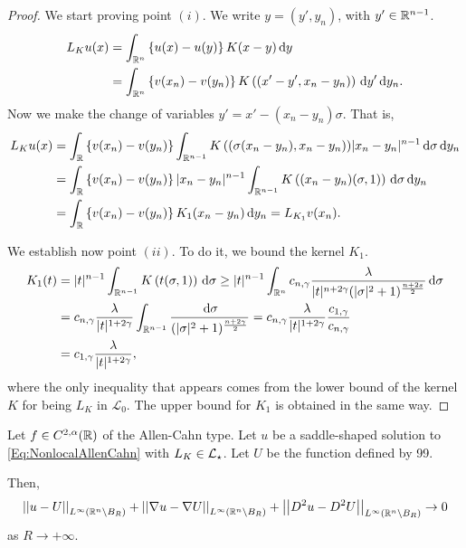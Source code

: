 \begin{proof}
	We start proving point $(i)$. We write $y=(y',y_n)$, with $y'\in \mathbb{R}^{n-1}$.
	\begin{align*}
	L_K u(x) &= \int_{\mathbb{R}^n} \left\{ u(x)-u(y) \right\} K(x-y) \,\mathrm{d} y \\
	&=\int_{\mathbb{R}^n} \left\{ v(x_n)-v(y_n) \right\} K\left((x'-y',x_n-y_n)\right) \,\mathrm{d} y' \,\mathrm{d} y_n.
	\end{align*}
	Now we make the change of variables $y' = x'-(x_n-y_n)\sigma$. That is,
	\begin{align*}
	L_K u(x) &= \int_{\mathbb{R}} \left\{ v(x_n)-v(y_n) \right\} \int_{\mathbb{R}^{n-1}} K\left((\sigma(x_n-y_n),x_n-y_n\right)) |x_n-y_n|^{n-1} \,\mathrm{d} \sigma \,\mathrm{d} y_n \\
	&= \int_{\mathbb{R}} \left\{ v(x_n)-v(y_n) \right\} |x_n-y_n|^{n-1} \int_{\mathbb{R}^{n-1}} K\left((x_n-y_n)(\sigma,1)\right) \,\mathrm{d}\sigma \,\mathrm{d} y_n \\
	&= \int_{\mathbb{R}} \left\{ v(x_n)-v(y_n) \right\} K_1(x_n-y_n ) \,\mathrm{d} y_n = L_{K_1}v(x_n). \\
	\end{align*}
	
	We establish now point $(ii)$. To do it, we bound the kernel $K_1$. 
	\begin{align*}
	K_1(t) &= |t|^{n-1} \int_{\mathbb{R}^{n-1}} K\left(t(\sigma,1)\right) \,\mathrm{d}\sigma \geq |t|^{n-1} \int_{\mathbb{R}^n} c_{n,\gamma} \frac{\lambda}{|t|^{n+2\gamma}(|\sigma|^2+1)^{\frac{n+2s}{2}}} \,\mathrm{d}\sigma \\
	&= c_{n,\gamma} \frac{\lambda}{|t|^{1+2\gamma}} \int_{\mathbb{R}^{n-1}} \frac{\,\mathrm{d}\sigma}{(|\sigma|^2+1)^{\frac{n+2\gamma}{2}}} = c_{n,\gamma} \frac{\lambda}{|t|^{1+2\gamma}} \frac{c_{1,\gamma}}{c_{n,\gamma}} \\
	&= c_{1,\gamma} \frac{\lambda}{|t|^{1+2\gamma}},
	\end{align*}
	where the only inequality that appears comes from the lower bound of the kernel $K$ for being $L_K $ in $\mathcal{L}_0$. The upper bound for $K_1$ is obtained in the same way.
\end{proof}






\begin{theorem}
\label{Th:AsymptoticBehaviourSaddleSolution}
Let $f\in C^{2,\alpha}(\mathbb{R})$ of the Allen-Cahn type. Let $u$ be a saddle-shaped solution to \eqref{Eq:NonlocalAllenCahn} with $L_K \in \mathcal{L}_\star$. Let $U$ be the function defined by 99.

Then,
$$
\left | \left |{u-U} \right | \right |_{L^\infty(\mathbb{R}^n\setminus B_R)}
+\left | \left |{\nabla u-\nabla U} \right | \right |_{L^\infty(\mathbb{R}^n\setminus B_R)}
+\left | \left |{D^2u-D^2U} \right | \right |_{L^\infty(\mathbb{R}^n\setminus B_R)} \to 0
$$
as $ R\to +\infty$.
\end{theorem}

